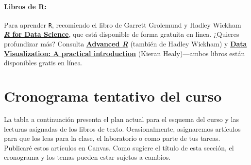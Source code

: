\documentclass[10pt]{article}
\begin{document}
\paragraph{Libros de R:} Para aprender \texttt{R}, recomiendo el libro de Garrett Grolemund y Hadley Wickham \href{http://r4ds.had.co.nz}{\textbf{\textit{R} for Data Science}}, que está disponible de forma gratuita en línea. ¿Quieres profundizar más? Consulta \href{http://adv-r.had.co.nz/}{\textbf{Advanced \textit{R}}} (también de Hadley Wickham) y \href{http://socviz.co/}{\textbf{Data Visualization: A practical introduction}} (Kieran Healy)---ambos libros están disponibles gratis en línea.



\section*{Cronograma tentativo del curso}

La tabla a continuación presenta el plan actual para el esquema del curso y las lecturas asignadas de los libros de texto. Ocasionalmente, asignaremos artículos para que los leas para la clase, el laboratorio o como parte de tus tareas. Publicaré estos artículos en Canvas. Como sugiere el título de esta sección, el cronograma y los temas pueden estar sujetos a cambios.
\end{document}
